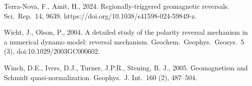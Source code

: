 \begin{list}
%
\item
{\color{red}
Terra-Nova, F., Amit, H., 2024. Regionally-triggered geomagnetic reversals. Sci.\ Rep.\ 14, 9639. https://doi.org/10.1038/s41598-024-59849-z.
}
%
\item
Wicht, J., Olson, P., 2004. A detailed study of the polarity reversal mechanism in a numerical dynamo model: reversal mechanism. Geochem.\ Geophys.\ Geosys.\ 5 (3), doi:10.1029/2003GC000602.
%
\item
Winch, D.E., Ivers, D.J., Turner, J.P.R., Stening, R. J., 2005. Geomagnetism and Schmidt quasi-normalization. Geophys.\ J. Int.\ 160 (2), 487--504.
%
\end{list}